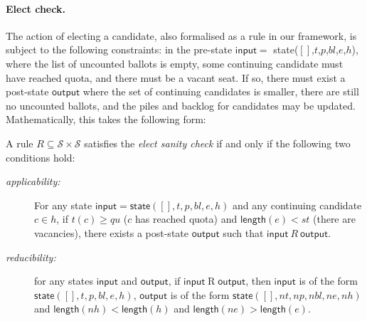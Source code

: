 \documentclass{llncs}
\begin{document}
\paragraph{Elect check.} The action of electing a candidate, also
formalised as a rule in our framework, is subject to the following
constraints: in the pre-state $\mathsf{input} = $
\textsf{state}($[]$,$t$,$p$,$bl$,$e$,$h$), 
where the list of uncounted ballots is empty,
some
continuing candidate must have reached quota, and there must be
a vacant seat.
If so, there must exist a
post-state $\mathsf{output}$ where the set of continuing candidates
is smaller, there are still no uncounted ballots, and the piles and
backlog for candidates may be updated. 
%
Mathematically, this takes the following form:
\begin{definition}\label{elect:check}
A rule $R \subseteq \mathcal{S} \times \mathcal{S}$ satisfies the
\emph{elect sanity check} if and only if the following two
conditions hold:
\begin{description}
\item[\it applicability:]
For any state $\mathsf{input} = \mathsf{state}([], t, p, bl, e, h)$
and any continuing candidate $c \in h$, if $t(c) \geq qu$ 
($c$ has reached quota) and $\mathsf{length}(e) < st$ (there are
vacancies), there exists a post-state $\mathsf{output}$ such
that 
$\mathsf{input} ~R~ \mathsf{output}$.
\item[\it reducibility:]
for any states $\mathsf{input}$ and $\mathsf{output}$, if
$\mathsf{input} \mathrel{R} \mathsf{output}$, then $\mathsf{input}$
is of the form 
$\mathsf{state}([],  t, p, bl, e, h)$, 
$\mathsf{output}$ is of the form 
$\mathsf{state} ([], nt, np, nbl, ne, nh)$ 
and 
$\mathsf{length}(nh) < \mathsf{length}(h)$
and
$\mathsf{length}(ne) > \mathsf{length}(e)$.
\end{description}
\end{definition}
\end{document}
